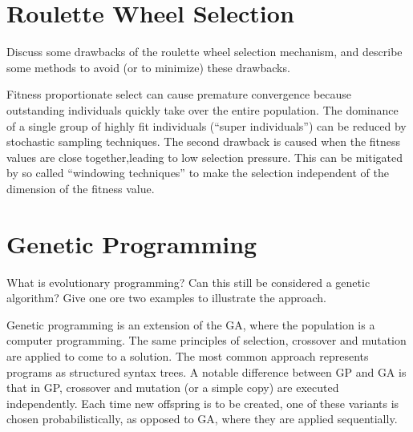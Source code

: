 \documentclass[../main.tex]{subfiles}
\begin{document}
\section{Roulette Wheel Selection}
\begin{question}
Discuss some drawbacks of the roulette wheel selection mechanism, and describe some methods to avoid (or to minimize)
these drawbacks.
\end{question}
\begin{solution}
Fitness proportionate select can cause premature convergence because outstanding individuals quickly take over the
entire population. The dominance of a single group of highly fit individuals (``super individuals'') can be reduced by
stochastic sampling techniques. The second drawback is caused when the fitness values are close together,leading to low
selection pressure. This can be mitigated by so called ``windowing techniques'' to make the selection independent of
the dimension of the fitness value.
\end{solution}

\section{Genetic Programming}
\begin{question}
What is evolutionary programming? Can this still be considered a genetic algorithm? Give one ore two examples to
illustrate the approach.
\end{question}
\begin{solution}
Genetic programming is an extension of the GA, where the population is a computer programming. The same principles of
selection, crossover and mutation are applied to come to a solution. The most common approach represents programs as
structured syntax trees. A notable difference between GP and GA is that in GP, crossover and mutation (or a simple
copy) are executed independently. Each time new offspring is to be created, one of these variants is chosen
probabilistically, as opposed to GA, where they are applied sequentially.
\end{solution}
\end{document}
